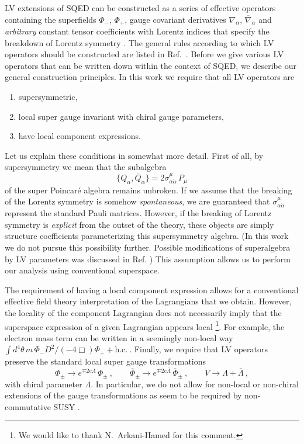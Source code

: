 \documentclass[12pt]{revtex4}
\begin{document}
LV extensions of SQED can be constructed as a series of effective
operators containing the superfields $\Phi_-$, $\Phi_+$,
gauge covariant derivatives $ \nabla_\alpha $, 
$ \overline{\nabla}_{\dot\alpha} $ and
%
{\em arbitrary} constant tensor coefficients with Lorentz indices 
that specify the
breakdown of Lorentz symmetry \cite{GrootNibbelink:2004za}. 
The general rules according to which LV operators should be
constructed are listed in Ref.\ \cite{MP:}. Before we give various
LV operators that can be written down within the context of SQED, we
describe our general construction principles. In this work we require
that all LV operators are  
\begin{enumerate}
\item supersymmetric, 
\item local super gauge invariant with chiral gauge parameters, 
\item have local component expressions. 
\end{enumerate}
Let us explain these conditions in somewhat more detail. First of all,
by supersymmetry we mean that the subalgebra 
\begin{equation}
\{ Q_\alpha, \overline{Q}_{\dot\alpha} \} = 
2 \sigma^\mu_{\alpha\dot{\alpha}} \, P_\mu
\end{equation}
of the super Poincar\'e algebra remains unbroken. If we assume that 
the breaking of the Lorentz symmetry is somehow 
{\em spontaneous}, we are guaranteed that
$\sigma^\mu_{\alpha\dot{\alpha}}$ represent the standard Pauli
matrices. However, if the breaking of Lorentz symmetry is {\em
explicit} from the outset of the theory, these objects are simply 
structure coefficients parameterizing this supersymmetry algebra. (In
this work we do not pursue this possibility further. Possible 
modifications of superalgebra by LV parameters was discussed in 
Ref. \cite{Berger:}) This assumption
allows us to perform our analysis using conventional superspace. 


The requirement of having a local component expression allows for a
conventional effective field theory interpretation of the Lagrangians that
we obtain. However, the locality of the component Lagrangian
does not necessarily imply that the superspace
expression of a given Lagrangian appears local \footnote{We would 
like to thank N.\ Arkani-Hamed for this comment.}. For example, the
electron mass term can be written in a seemingly non-local way  
\(
\int d^4 \theta\, m \, \Phi_- D^2/(- 4\Box) \Phi_+ + \text{h.c.}~.
\)
%
Finally, we require that LV operators preserve the standard local
super gauge transformations  
\begin{equation}
\Phi_\pm \rightarrow e^{\mp 2 e \Lambda} \, \Phi_\pm~, 
\qquad 
\overline{\Phi}_\pm \rightarrow e^{\mp 2 e \overline{\Lambda}} \, 
\overline{\Phi}_\pm~, 
\qquad 
V \rightarrow \Lambda + \overline{\Lambda}~, 
\label{Gauge}
\end{equation} 
with chiral parameter $\Lambda$. In particular, we do not allow for
non-local or non-chiral extensions of the gauge transformations as
seem to be required by non-commutative SUSY
\cite{Putz:2002ib,Mikulovic:2003sq}.  
\end{document}
